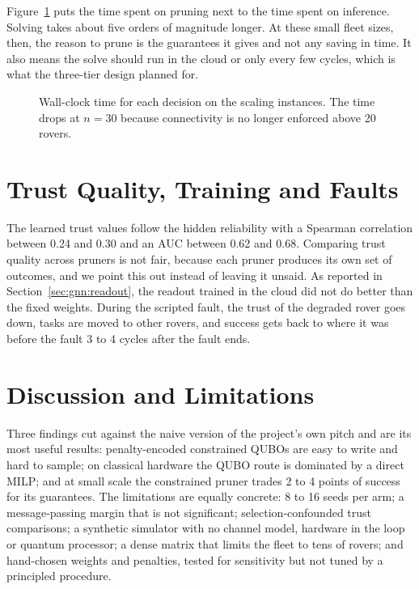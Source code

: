 Figure~\ref{fig:res:latency} puts the time spent on pruning next to the time
spent on inference. Solving takes about five orders of magnitude longer. At
these small fleet sizes, then, the reason to prune is the guarantees it gives
and not any saving in time. It also means the solve should run in the cloud or
only every few cycles, which is what the three-tier design planned for.

\begin{figure}[htbp]
\centering
{}
\caption{Wall-clock time for each decision on the scaling instances. The
time drops at $n=30$ because connectivity is no longer enforced above 20
rovers.}
\label{fig:res:latency}
\end{figure}

\section{Trust Quality, Training and Faults}

The learned trust values follow the hidden reliability with a Spearman
correlation between 0.24 and 0.30 and an AUC between 0.62 and 0.68. Comparing
trust quality across pruners is not fair, because each pruner produces its own
set of outcomes, and we point this out instead of leaving it unsaid. As
reported in Section~\ref{sec:gnn:readout}, the readout trained in the cloud
did not do better than the fixed weights. During the scripted fault, the trust
of the degraded rover goes down, tasks are moved to other rovers, and success
gets back to where it was before the fault 3 to 4 cycles after the fault
ends.

\section{Discussion and Limitations}

Three findings cut against the naive version of the project's own pitch and
are its most useful results: penalty-encoded constrained QUBOs are easy to
write and hard to sample; on classical hardware the QUBO route is dominated by
a direct MILP; and at small scale the constrained pruner trades 2 to 4 points
of success for its guarantees. The limitations are equally concrete: 8 to 16
seeds per arm; a message-passing margin that is not significant;
selection-confounded trust comparisons; a synthetic simulator with no channel
model, hardware in the loop or quantum processor; a dense matrix that limits
the fleet to tens of rovers; and hand-chosen weights and penalties, tested for
sensitivity but not tuned by a principled procedure.
